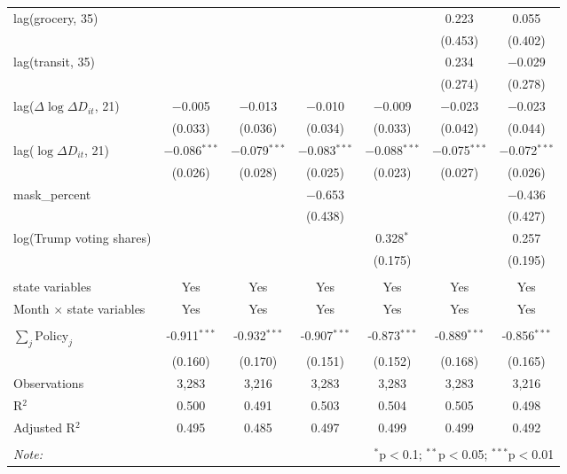 \begin{tabular}{@{\extracolsep{1pt}}lcccccc}
  lag(grocery, 35) &  &  &  &  & 0.223 & 0.055 \\ 
  &  &  &  &  & (0.453) & (0.402) \\ 
  lag(transit, 35) &  &  &  &  & 0.234 & $-$0.029 \\ 
  &  &  &  &  & (0.274) & (0.278) \\ 
  lag($\Delta \log \Delta D_{it}$, 21) & $-$0.005 & $-$0.013 & $-$0.010 & $-$0.009 & $-$0.023 & $-$0.023 \\ 
  & (0.033) & (0.036) & (0.034) & (0.033) & (0.042) & (0.044) \\ 
  lag($\log \Delta D_{it}$, 21) & $-$0.086$^{***}$ & $-$0.079$^{***}$ & $-$0.083$^{***}$ & $-$0.088$^{***}$ & $-$0.075$^{***}$ & $-$0.072$^{***}$ \\ 
  & (0.026) & (0.028) & (0.025) & (0.023) & (0.027) & (0.026) \\ 
  mask\_percent &  &  & $-$0.653 &  &  & $-$0.436 \\ 
  &  &  & (0.438) &  &  & (0.427) \\ 
  log(Trump voting shares) &  &  &  & 0.328$^{*}$ &  & 0.257 \\ 
  &  &  &  & (0.175) &  & (0.195) \\ 
 \hline \\[-1.8ex] 
state variables & Yes & Yes & Yes & Yes & Yes & Yes \\ 
Month $\times$ state variables & Yes & Yes & Yes & Yes & Yes & Yes \\ 
\hline \\[-1.8ex] 
$\sum_j \mathrm{Policy}_j$ & -0.911$^{***}$ & -0.932$^{***}$ & -0.907$^{***}$ & -0.873$^{***}$ & -0.889$^{***}$ & -0.856$^{***}$ \\ 
 & (0.160) & (0.170) & (0.151) & (0.152) & (0.168) & (0.165) \\ 
Observations & 3,283 & 3,216 & 3,283 & 3,283 & 3,283 & 3,216 \\ 
R$^{2}$ & 0.500 & 0.491 & 0.503 & 0.504 & 0.505 & 0.498 \\ 
Adjusted R$^{2}$ & 0.495 & 0.485 & 0.497 & 0.499 & 0.499 & 0.492 \\ 
\hline 
\hline \\[-1.8ex] 
\textit{Note:}  & \multicolumn{6}{r}{$^{*}$p$<$0.1; $^{**}$p$<$0.05; $^{***}$p$<$0.01} \\ 
\end{tabular} 